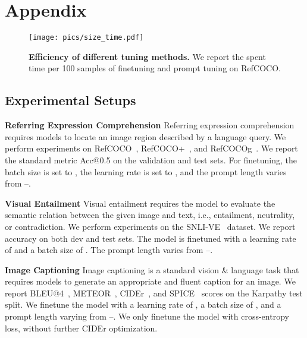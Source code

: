 \documentclass[11pt]{article}
\begin{document}



\appendix

\section{Appendix}
\label{sec:appendix}


\begin{figure}[t]
    \centering
    \texttt{[image: pics/size\_time.pdf]}
    \caption{\textbf{Efficiency of different tuning methods. }We report the spent time per 100 samples of finetuning and prompt tuning on RefCOCO.}
\label{fig:speed}
\end{figure}







\subsection{Experimental Setups}
\label{sec:appendix_setups}
\noindent \textbf{Referring Expression Comprehension}  Referring expression comprehension requires models to locate an image region described by a language query. We perform experiments on RefCOCO~\citep{refcoco}, RefCOCO+~\citep{refcoco}, and RefCOCOg~\citep{refcocog}. 
We report the standard metric Acc@0.5 on the validation and test sets. 
For finetuning, the batch
size is set to , the learning rate is set to , and the prompt length varies from –.

\noindent \textbf{Visual Entailment}  Visual entailment requires the model to evaluate the semantic relation between the given image and text, i.e., entailment, neutrality, or contradiction. We perform experiments on the SNLI-VE~\citep{snli-ve} dataset. 
We report accuracy on both dev and test sets. 
The model is finetuned  with a learning rate of  and a batch size of . The prompt length varies from –.

\noindent \textbf{Image Captioning}  Image captioning is a standard vision \& language task that requires models to generate an appropriate and fluent caption for an image. 
We report BLEU@4~\citep{bleu}, METEOR~\citep{meteor}, CIDEr~\citep{cider}, and SPICE~\citep{spice} scores on the Karpathy test split. 
We finetune the model with a learning rate of , a batch size of , and a prompt length varying from –. 
We only finetune the model with cross-entropy loss, without further CIDEr optimization. 
\end{document}
